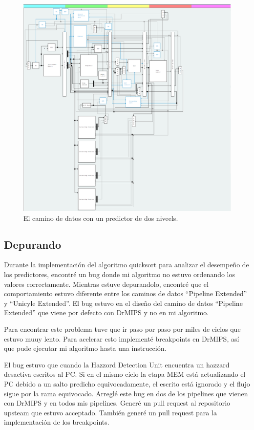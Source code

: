 \documentclass[a4paper]{article}
\begin{document}
\begin{figure}[!htb]
\centering
\includegraphics[scale=0.4]{./img/two_level_drmips}
\caption{El camino de datos con un predictor de dos niveels.}
\label{fig:two_level_drmips}
\end{figure}

\subsection{Depurando}

Durante la implementación del algoritmo quicksort para analizar el desempeño de los predictores, encontré un bug donde mi algoritmo no estuvo ordenando los valores correctamente. Mientras estuve depurandolo, encontré que el comportamiento estuvo diferente entre los caminos de datos ``Pipeline Extended'' y ``Unicyle Extended''. El bug estuvo en el diseño del camino de datos ``Pipeline Extended'' que viene por defecto con DrMIPS y no en mi algoritmo.

Para encontrar este problema tuve que ir paso por paso por miles de ciclos que estuvo muuy lento. Para acelerar esto implementé breakpoints en DrMIPS, así que pude ejecutar mi algoritmo hasta una instrucción.

El bug estuvo que cuando la Hazzord Detection Unit encuentra un hazzard desactiva escritos al PC. Si en el mismo cíclo la etapa MEM está actualizando el PC debido a un salto predicho equivocadamente, el escrito está ignorado y el flujo sigue por la rama equivocado. Arreglé este bug en dos de los pipelines que vienen con DrMIPS y en todos mis pipelines. Generé un pull request al repositorio upsteam que estuvo acceptado. También generé un pull request para la implementación de los breakpoints.
\end{document}
